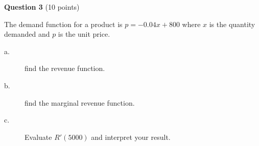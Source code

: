 \documentclass[11pt,letterpaper]{exam}
\begin{document}
\textbf{Question 3} (10 points)

The demand function for a product is $p = -0.04x+800$ where $x$ is the quantity demanded and $p$ is the unit price.
\begin{description}
\item[a.] find the revenue function.
\item[b.] find the marginal revenue function.
  \item[c.] Evaluate $R'(5000)$ and interpret your result.
\end{description}






\end{document}
